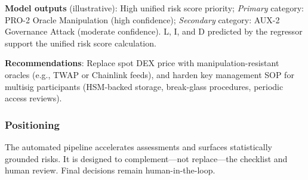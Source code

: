 \textbf{Model outputs} (illustrative): High unified risk score priority; \textit{Primary} category: PRO-2 Oracle Manipulation (high confidence); \textit{Secondary} category: AUX-2 Governance Attack (moderate confidence). L, I, and D predicted by the regressor support the unified risk score calculation.

\textbf{Recommendations}: Replace spot DEX price with manipulation-resistant oracles (e.g., TWAP or Chainlink feeds), and harden key management SOP for multisig participants (HSM-backed storage, break-glass procedures, periodic access reviews).

\subsubsection{Positioning}
The automated pipeline accelerates assessments and surfaces statistically grounded risks. It is designed to complement---not replace---the checklist and human review. Final decisions remain human-in-the-loop.


